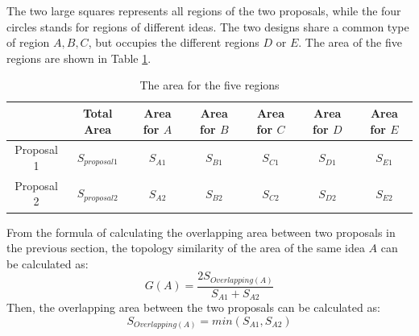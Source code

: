The two large squares represents all regions of the two proposals, while the four circles stands for regions of different ideas. The two designs share a common type of region $A,B,C$, but occupies the different regions $D$ or $E$. The area of the five regions are shown in Table \ref{geo3}.

\begin{table}[H]
\centering
\caption{The area for the five regions}
\label{geo3}
\begin{tabular}{|c|c|c|c|c|c|c|}
\hline
       & Total Area & Area for $A$ & Area for $B$ & Area for $C$ & Area for $D$ & Area for $E$ \\ \hline
Proposal 1 &    $S_{proposal1}$       &     $S_{A1}$       &    $S_{B1}$          &       $S_{C1}$       &           $S_{D1}$   &    $S_{E1}$          \\ \hline
Proposal 2 &   $S_{proposal2}$         &    $S_{A2}$        &     $S_{B2}$       &   $S_{C2}$     &       $S_{D2}$     &    $S_{E2}$        \\ \hline
\end{tabular}
\end{table}
From the formula of calculating the overlapping area between two proposals in the previous section, the topology similarity of the area of the same idea $A$ can be calculated as:
\begin{equation}
 G(A) = \frac{2S_{Overlapping(A)}}{S_{A1}+S_{A2}}   
\end{equation}
Then, the overlapping area between the two proposals can be calculated as:
\begin{equation}
S_{Overlapping(A)}=min(S_{A1},S_{A2})
\end{equation}

